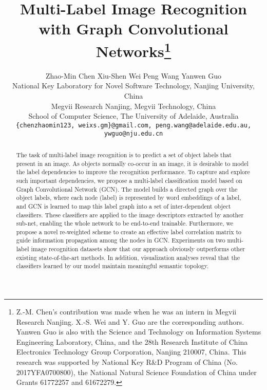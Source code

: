 \documentclass[10pt,twocolumn,letterpaper]{article}
\begin{document}
\title{Multi-Label Image Recognition with Graph Convolutional Networks\thanks{Z.-M. Chen's contribution was made when he was an intern in Megvii Research Nanjing. X.-S. Wei and Y. Guo are the corresponding authors. Yanwen Guo is also with the Science and Technology on Information Systems Engineering Laboratory, China, and the 28th Research Institute of China Electronics Technology Group Corporation, Nanjing 210007, China. This research was supported by National Key R\&D Program of China (No. 2017YFA0700800), the National Natural Science Foundation of China under Grants 61772257 and 61672279.
}}

\author{Zhao-Min Chen \qquad Xiu-Shen Wei \qquad Peng Wang \qquad Yanwen Guo\\
\noindent National Key Laboratory for Novel Software Technology, Nanjing University, China\\
Megvii Research Nanjing, Megvii Technology, China\\
School of Computer Science, The University of Adelaide, Australia\\
{\tt\small \{chenzhaomin123, weixs.gm\}@gmail.com, peng.wang@adelaide.edu.au, ywguo@nju.edu.cn}\\}

\maketitle
\thispagestyle{empty}

\begin{abstract}
The task of multi-label image recognition is to predict a set of object labels that present in an image. As objects normally co-occur in an image, it is desirable to model the label dependencies to improve the recognition performance. To capture and explore such important dependencies, we propose a multi-label classification model based on Graph Convolutional Network (GCN). The model builds a directed graph over the object labels, where each node (label) is represented by word embeddings of a label, and GCN is learned to map this label graph into a set of inter-dependent object classifiers. These classifiers are applied to the image descriptors extracted by another sub-net, enabling the whole network to be end-to-end trainable. Furthermore, we propose a novel re-weighted scheme to create an effective label correlation matrix to guide information propagation among the nodes in GCN. Experiments on two multi-label image recognition datasets show that our approach obviously outperforms other existing state-of-the-art methods. In addition, visualization analyses reveal that the classifiers learned by our model maintain meaningful semantic topology.
\end{abstract}
\end{document}
